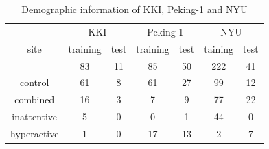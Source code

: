 \documentclass{llncs}
\begin{document}
\begin{table}
\caption{Demographic information of KKI, Peking-1 and NYU}
\label{tab:1}
\begin{center}
\begin{tabular}{|c|c|c|c|c|c|c|}
\hline
\multirow{3}{*}{site}	& \multicolumn{2}{c|}{KKI} & \multicolumn{2}{c|}{Peking-1} & \multicolumn{2}{c|}{NYU} \\
\cline{2-7}\rule{0pt}{12pt}
					 	& training & \quad test \quad\quad & training	&\quad test\quad\quad	& taining & \quad test\quad\quad \\
						& 83		   & 11	  &    85   &   50  &   222   &   41 \\ [2pt]
\hline \rule{0pt}{12pt}
control					& 61		   & 8    &    61   &    27 &   99    &   12 \\
combined					& 16		   & 3    &    7    &    9  &   77    &   22 \\
inattentive				& 5		   & 0    &    0    &    1  &   44    &   0 \\
hyperactive				& 1		   & 0    &    17   &    13 &   2     &   7 \\[2pt]
\hline
\end{tabular}
\end{center}
\end{table}
\end{document}

